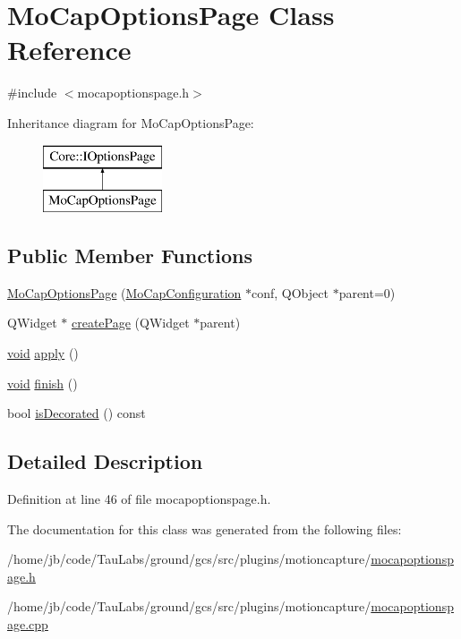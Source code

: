 \hypertarget{class_mo_cap_options_page}{\section{\-Mo\-Cap\-Options\-Page \-Class \-Reference}
\label{class_mo_cap_options_page}
}


{\ttfamily \#include $<$mocapoptionspage.\-h$>$}

\-Inheritance diagram for \-Mo\-Cap\-Options\-Page\-:\begin{figure}[H]
\begin{center}
\leavevmode
\includegraphics[height=2.000000cm]{class_mo_cap_options_page}
\end{center}
\end{figure}
\subsection*{\-Public \-Member \-Functions}
\begin{DoxyCompactItemize}
\item 
\hyperlink{group___mo_cap_plugin_gaab2f4270ddf74e0e284cf1ea61d646c8}{\-Mo\-Cap\-Options\-Page} (\hyperlink{class_mo_cap_configuration}{\-Mo\-Cap\-Configuration} $\ast$conf, \-Q\-Object $\ast$parent=0)
\item 
\-Q\-Widget $\ast$ \hyperlink{group___mo_cap_plugin_gab507e9ec6cd64d26e3034dcf753885ad}{create\-Page} (\-Q\-Widget $\ast$parent)
\item 
\hyperlink{group___u_a_v_objects_plugin_ga444cf2ff3f0ecbe028adce838d373f5c}{void} \hyperlink{group___mo_cap_plugin_gaa5c95a0fa9de269561e8adb51407862a}{apply} ()
\item 
\hyperlink{group___u_a_v_objects_plugin_ga444cf2ff3f0ecbe028adce838d373f5c}{void} \hyperlink{group___mo_cap_plugin_ga00ac715fe603d78584cf772904147f38}{finish} ()
\item 
bool \hyperlink{group___mo_cap_plugin_gaea29fdd6e8a640f92167d6a581d23eac}{is\-Decorated} () const 
\end{DoxyCompactItemize}


\subsection{\-Detailed \-Description}


\-Definition at line 46 of file mocapoptionspage.\-h.



\-The documentation for this class was generated from the following files\-:\begin{DoxyCompactItemize}
\item 
/home/jb/code/\-Tau\-Labs/ground/gcs/src/plugins/motioncapture/\hyperlink{mocapoptionspage_8h}{mocapoptionspage.\-h}\item 
/home/jb/code/\-Tau\-Labs/ground/gcs/src/plugins/motioncapture/\hyperlink{mocapoptionspage_8cpp}{mocapoptionspage.\-cpp}\end{DoxyCompactItemize}
